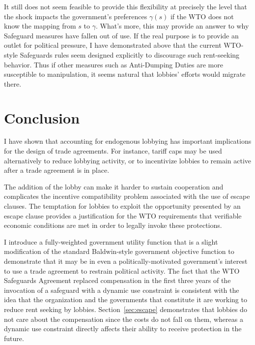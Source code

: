 \documentclass[12pt]{article}
\newcommand{\ga}{\gamma}
\begin{document}
It still does not seem feasible to provide this flexibility at precisely the level that the shock impacts the government's preferences $\ga(s)$ if the WTO does not know the mapping from $s$ to $\ga$. What's more, this may provide an answer to why Safeguard measures have fallen out of use. If the real purpose is to provide an outlet for political pressure, I have demonstrated above that the current WTO-style Safeguards rules seem designed explicitly to discourage such rent-seeking behavior. Thus if other measures such as Anti-Dumping Duties are more susceptible to manipulation, it seems natural that lobbies' efforts would migrate there.

	


%

\section{Conclusion}
\label{sec:concl}
I have shown that accounting for endogenous lobbying has important implications for the design of trade agreements. For instance, tariff caps may be used alternatively to reduce lobbying activity, or to incentivize lobbies to remain active after a trade agreement is in place.

The addition of the lobby can make it harder to sustain cooperation and complicates the incentive compatibility problem associated with the use of escape clauses. The temptation for lobbies to exploit the opportunity presented by an escape clause provides a justification for the WTO requirements that verifiable economic conditions are met in order to legally invoke these protections.

I introduce a fully-weighted government utility function that is a slight modification of the standard Baldwin-style government objective function to demonstrate that it may be in even a politically-motivated government's interest to use a trade agreement to restrain political activity. The fact that the WTO Safeguards Agreement replaced compensation in the first three years of the invocation of a safeguard with a dynamic use constraint is consistent with the idea that the organization and the governments that constitute it are working to reduce rent seeking by lobbies. Section~\ref{sec:escape} demonstrates that lobbies do not care about the compensation since the costs do not fall on them, whereas a dynamic use constraint directly affects their ability to receive protection in the future.
\end{document}
